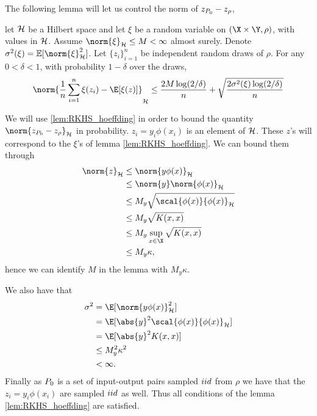 The following lemma will let us control the norm of \(z_{P_{0}} - z_{\rho}\),
\begin{lemma}
  \label{lem:RKHS_hoeffding}
  let \(\mathcal{H}\) be a Hilbert space and let \(\xi\) be a random variable
  on \((\X \times \Y, \rho)\), with values in \(\mathcal{H}\). Assume
  \(\norm{\xi}_{\rkhs{H}} \leq M < \infty\) almost surely. Denote
  \(\sigma^2(\xi) = \mathbb{E}[\norm{\xi}_{\rkhs{H}}^2]\). Let
  \(\{z_i\}_{i=1}^n\) be independent random draws of \(\rho\). For any \(0 <
  \delta < 1\), with probability \(1 - \delta\) over the draws,
  \begin{equation*}
    \label{eq:RKHS_hoeffding_bound}
    \norm{\frac{1}{n}\sum_{i=1}^n\xi(z_i) - \E[\xi(z)]}_{\rkhs{H}} \leq \frac{2 M \log(2/\delta)}{n} + \sqrt{\frac{2 \sigma^2(\xi) \log(2/\delta)}{n}}
  \end{equation*}
\end{lemma}

We will use \ref{lem:RKHS_hoeffding} in order to bound the quantity
\(\norm{z_{\poolset_0} - z_{\rho}}_{\rkhs{H}}\) in probability. \(z_{i} = y_{i}
\phi(x_{i})\) is an element of \(\mathcal{H}\). These \(z\)'s will correspond to
the \(\xi\)'s of lemma \ref{lem:RKHS_hoeffding}. We can bound them through
\begin{align*}
  \norm{z}_{\rkhs{H}} & \leq \norm{y \phi(x)}_{\rkhs{H}} \\
                      & \leq \norm{y}\norm{\phi(x)}_{\rkhs{H}} \\
                      & \leq M_y\sqrt{\scal{\phi(x)}{\phi(x)}_{\rkhs{H}}} \\
                      & \leq M_y\sqrt{K(x, x)} \\
                      & \leq M_y \sup_{x \in \X} \sqrt{K(x, x)} \\
                      & \leq M_y \kappa,
\end{align*}
hence we can identify \(M\) in the lemma with \(M_{y}\kappa\).

We also have that
\begin{align*}
  \sigma^2 & = \E[\norm{y \phi(x)}_{\rkhs{H}}^2] \\
           & = \E[\abs{y}^2 \scal{\phi(x)}{\phi(x)}_{\rkhs{H}}] \\
           & = \E[\abs{y}^2 K(x, x)] \\
           & \leq M^2_y \kappa^2 \\
           & < \infty.
\end{align*}
Finally as \(P_{0}\) is a set of input-output pairs sampled \(iid\) from \(\rho\)
we have that the \(z_{i} = y_{i}\phi(x_{i})\) are sampled \(iid\) as well. Thus
all conditions of the lemma \ref{lem:RKHS_hoeffding} are satisfied.

